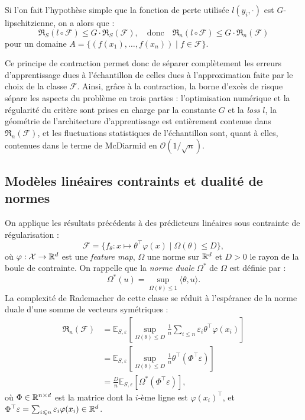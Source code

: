 Si l'on fait l'hypothèse simple que la fonction de perte utilisée $l(y_i, \cdot)$ est $G$-lipschitzienne, on a alors que : 
\begin{equation}
    \mathfrak{R}_S(l \circ \mathcal{F}) \leqslant G \cdot \mathfrak{R}_S( \mathcal{F}), \quad \text{donc} \quad \mathfrak{R}_n(l \circ \mathcal{F}) \leqslant G \cdot \mathfrak{R}_n( \mathcal{F})
\end{equation}
pour un domaine $ A = \{(f(x_1), \dots, f(x_n)) \mid f \in \mathcal{F}\}$. 

\begin{remark}
    Ce principe de contraction permet donc de séparer complètement les erreurs d'apprentissage dues à l'échantillon de celles dues à l'approximation faite par le choix de la classe $ \mathcal{F}$. 
    Ainsi, grâce à la contraction, la borne d'excès de risque sépare les aspects du problème en trois parties :  l'optimisation numérique et la régularité du critère sont prises en charge par la constante $ G$ et la \emph{loss} $l$, la géométrie de l'architecture d'apprentissage est entièrement contenue dans $ \mathfrak{R}_n( \mathcal{F})$, et les fluctuations statistiques de l'échantillon sont, quant à elles, contenues dans le terme de McDiarmid en $ \mathcal{O}(1 / \sqrt{n})$.
\end{remark}

\subsection{Modèles linéaires contraints et dualité de normes}

On applique les résultats précédents à des prédicteurs linéaires sous contrainte de régularisation :
\begin{equation}
    \mathcal{F} = \{f_\theta : x \longmapsto \theta^\top \varphi(x) \mid \Omega(\theta) \leqslant D\},
\end{equation}
où $\varphi : \mathcal{X} \to \mathbb{R}^d$ est une \emph{feature map}, $\Omega$ une norme sur $\mathbb{R}^d$ et $D > 0$ le rayon de la boule de contrainte. 
On rappelle que la \emph{norme duale} $\Omega^*$ de $\Omega$ est définie par :
\begin{equation}
    \Omega^*(u) = \sup_{\Omega(\theta) \leqslant 1} \langle \theta, u \rangle.
\end{equation}
La complexité de Rademacher de cette classe se réduit à l'espérance de la norme duale d'une somme de vecteurs symétriques :
\begin{align*}
    \mathfrak{R}_n(\mathcal{F}) 
    &= \mathbb{E}_{S, \varepsilon} \left[ \sup_{\Omega(\theta) \leqslant D} \frac{1}{n} \sum_{i \leqslant n} \varepsilon_i \theta^\top \varphi(x_i) \right] \\
    &= \mathbb{E}_{S, \varepsilon} \left[ \sup_{\Omega(\theta) \leqslant D} \frac{1}{n} \theta^\top (\Phi^\top \varepsilon) \right] \\
    &= \frac{D}{n} \mathbb{E}_{S, \varepsilon} \left[ \Omega^*(\Phi^\top \varepsilon) \right],
\end{align*}
où $\Phi \in \mathbb{R}^{n \times d}$ est la matrice dont la $i$-ème ligne est $\varphi(x_i)^\top$, et $\Phi^\top \varepsilon = \sum_{i \leqslant n} \varepsilon_i \varphi(x_i) \in \mathbb{R}^d$.

